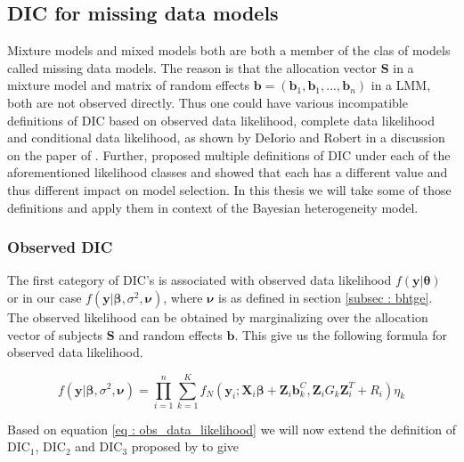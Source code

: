 \subsection{DIC for missing data models}
\label{subsec : DIC_missing_data_models}
Mixture models and mixed models both are both a member of the clas of models called missing data models. The reason is that the allocation vector $\boldsymbol{S}$ in a mixture model and matrix of random effects $\boldsymbol{b}=(\boldsymbol{b}_1, \boldsymbol{b}_1, ..., \boldsymbol{b}_n)$ in a LMM, both are not observed directly. Thus one could have various incompatible definitions of DIC based on observed data likelihood, complete data likelihood and conditional data likelihood, as shown by DeIorio and Robert in a discussion on the paper of \citet{spiegelhalter_bayesian_2002}. Further, \citet{celeux_deviance_2006} proposed multiple definitions of DIC under each of the aforementioned likelihood classes and showed that each has a different value and thus different impact on model selection. In this thesis we will take some of those definitions and apply them in context of the Bayesian heterogeneity model. 

\subsubsection{Observed DIC}
The first category of DIC's is associated with observed data likelihood $f(\boldsymbol{y}|\boldsymbol{\theta})$ or in our case $f(\boldsymbol{y}|\boldsymbol{\beta}, \sigma^2, \boldsymbol{\nu})$, where $\boldsymbol{\nu}$ is as defined in section \ref{subsec : bhtge}. The observed likelihood can be obtained by marginalizing over the allocation vector of subjects $\boldsymbol{S}$ and random effects $\boldsymbol{b}$. This give us the following formula for observed data likelihood.

\begin{equation}
\label{eq : obs_data_likelihood}
f(\boldsymbol{y}|\boldsymbol{\beta}, \sigma^2, \boldsymbol{\nu}) = \prod_{i=1}^n \sum_{k=1}^K f_N(\boldsymbol{y}_i; \boldsymbol{X}_i\boldsymbol{\beta} + \boldsymbol{Z}_i \boldsymbol{b}_k^C, \boldsymbol{Z}_{i} G_k \boldsymbol{Z}_{i}^T+ R_i) \eta_k
\end{equation}
 
Based on equation \ref{eq : obs_data_likelihood} we will now extend the definition of $\text{DIC}_1$, $\text{DIC}_2$ and $\text{DIC}_3$ proposed by \citet{celeux_deviance_2006} to give

